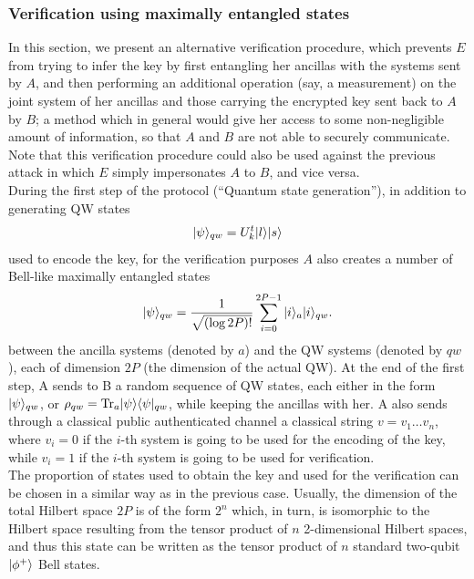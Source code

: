 \subsubsection{Verification using maximally entangled states}
\label{sec:bellver}
In this section, we present an alternative verification procedure, which prevents $E$ from trying to infer the key by first entangling her ancillas with the systems sent by $A$, and then performing an additional operation (say, a measurement) on the joint system of her ancillas and those carrying the encrypted key sent back to $A$ by $B$; a method which in general would give her access to some non-negligible amount of information, so that $A$ and $B$ are not able to securely communicate. 
Note that this verification procedure could also be used against the previous attack in which $E$ simply impersonates $A$ to $B$, and vice versa. \\ During the first step of the protocol (``Quantum state generation''), in addition to generating QW states
\begin{equation}
\label{states:1}
	| \psi \rangle_{qw}=U_k^t| l \rangle| s \rangle
\end{equation}
used to encode the key, for the verification purposes $A$ also creates a number of Bell-like maximally entangled states
\begin{equation}
\label{states:2}
	| \psi \rangle_{qw}=\frac{1}{\sqrt{(\log 2P)!}}\sum_{i=0}^{2P-1}| i \rangle_a| i \rangle_{qw}.
\end{equation}
between the ancilla systems (denoted by $a$) and the QW systems (denoted by $qw$), each of dimension $2P$ (the dimension of the actual QW). At the end of the first step, A sends to B a random sequence of QW states, each either in the form $| \psi \rangle_{qw}$, or $\rho_{qw} = \text{Tr}_a| \psi \rangle\langle \psi |_{qw}$, while keeping the ancillas with her. A also sends through a classical public authenticated channel a classical string $v=v_1\ldots v_n$, where $v_i=0$ if the $i$-th system is going to be used for the encoding of the key, while $v_i=1$ if the $i$-th system is going to be used for verification.\\
The proportion of states used to obtain the key and used for the verification can be chosen in a similar way as in the previous case. Usually, the dimension of the total Hilbert space $2P$ is of the form $2^n$ which, in turn, is isomorphic to the Hilbert space resulting from the  tensor product of $n$ 2-dimensional Hilbert spaces, and thus this state can be written as the tensor product of $n$ standard two-qubit $| \phi^+ \rangle$ Bell states.

